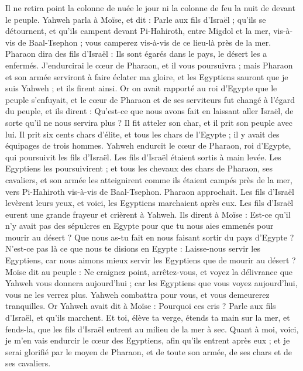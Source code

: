 \begin{multicols}{2}
Il ne retira point la colonne de nuée le jour ni la colonne de feu la nuit de devant le peuple.
\VerseOne{}Yahweh parla à Moïse, et dit :
Parle aux fils d'Israël ; qu'ils se détournent, et qu'ils campent devant Pi-Hahiroth, entre Migdol et la mer, vis-à-vis de Baal-Tsephon ; vous camperez vis-à-vis de ce lieu-là près de la mer\FTNT{}.
Pharaon dira des fils d'Israël : Ils sont égarés dans le pays, le désert les a enfermés.
J'endurcirai le cœur de Pharaon, et il vous poursuivra ; mais Pharaon et son armée serviront à faire éclater ma gloire, et les Egyptiens sauront que je suis Yahweh ; et ils firent ainsi.
Or on avait rapporté au roi d'Egypte que le peuple s'enfuyait, et le cœur de Pharaon et de ses serviteurs fut changé à l'égard du peuple, et ils dirent : Qu'est-ce que nous avons fait en laissant aller Israël, de sorte qu'il ne nous servira plus ?
Il fit atteler son char, et il prit son peuple avec lui.
Il prit six cents chars d'élite, et tous les chars de l'Egypte ; il y avait des équipages de trois hommes.
Yahweh endurcit le cœur de Pharaon, roi d'Egypte, qui poursuivit les fils d'Israël. Les fils d'Israël étaient sortis à main levée\FTNT{}.
Les Egyptiens les poursuivirent ; et tous les chevaux des chars de Pharaon, ses cavaliers, et son armée les atteignirent comme ils étaient campés près de la mer, vers Pi-Hahiroth vis-à-vis de Baal-Tsephon.
Pharaon approchait. Les fils d'Israël levèrent leurs yeux, et voici, les Egyptiens marchaient après eux. Les fils d'Israël eurent une grande frayeur et crièrent à Yahweh.
Ils dirent à Moïse : Est-ce qu'il n'y avait pas des sépulcres en Egypte pour que tu nous aies emmenés pour mourir au désert ? Que nous as-tu fait en nous faisant sortir du pays d'Egypte ?
N’est-ce pas là ce que nous te disions en Egypte : Laisse-nous servir les Egyptiens, car nous aimons mieux servir les Egyptiens que de mourir au désert ?
Moïse dit au peuple : Ne craignez point, arrêtez-vous, et voyez la délivrance que Yahweh vous donnera aujourd'hui ; car les Egyptiens que vous voyez aujourd'hui, vous ne les verrez plus.
Yahweh combattra pour vous, et vous demeurerez tranquilles.
Or Yahweh avait dit à Moïse : Pourquoi ces cris ? Parle aux fils d'Israël, et qu'ils marchent.
Et toi, élève ta verge, étends ta main sur la mer, et fends-la, que les fils d'Israël entrent au milieu de la mer à sec.
Quant à moi, voici, je m'en vais endurcir le cœur des Egyptiens, afin qu'ils entrent après eux ; et je serai glorifié par le moyen de Pharaon, et de toute son armée, de ses chars et de ses cavaliers.

\end{multicols}
